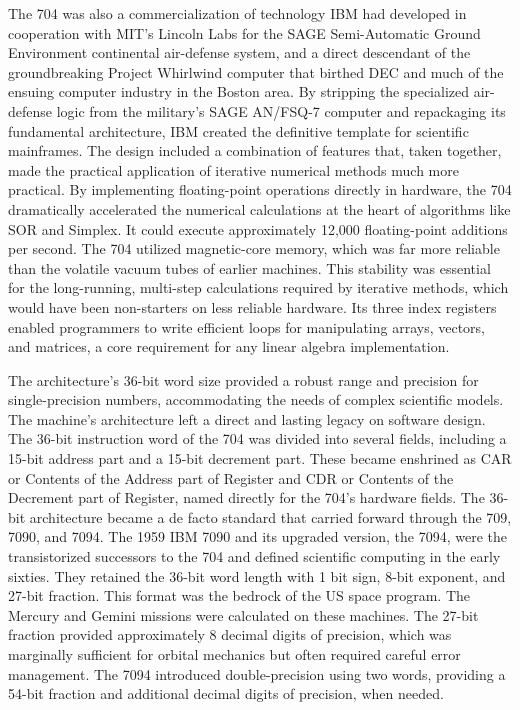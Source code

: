 The 704 was also a commercialization of technology IBM had developed in cooperation with MIT's Lincoln Labs for the SAGE Semi-Automatic Ground Environment continental air-defense system, and a direct descendant of the groundbreaking Project Whirlwind computer that birthed DEC and much of the ensuing computer industry in the Boston area. By stripping the specialized air-defense logic from the military’s SAGE AN/FSQ-7 computer and repackaging its fundamental architecture, IBM created the definitive template for scientific mainframes. The design included a combination of features that, taken together, made the practical application of iterative numerical methods much more practical. By implementing floating-point operations directly in hardware, the 704 dramatically accelerated the numerical calculations at the heart of algorithms like SOR and Simplex. It could execute approximately 12,000 floating-point additions per second. The 704 utilized magnetic-core memory, which was far more reliable than the volatile vacuum tubes of earlier machines. This stability was essential for the long-running, multi-step calculations required by iterative methods, which would have been non-starters on less reliable hardware. Its three index registers enabled programmers to write efficient loops for manipulating arrays, vectors, and matrices, a core requirement for any linear algebra implementation. 

The architecture’s 36-bit word size provided a robust range and precision for single-precision numbers, accommodating the needs of complex scientific models. The machine's architecture left a direct and lasting legacy on software design. The 36-bit instruction word of the 704 was divided into several fields, including a 15-bit address part and a 15-bit decrement part. These became enshrined as CAR or Contents of the Address part of Register and CDR or Contents of the Decrement part of Register, named directly for the 704’s hardware fields. The 36-bit architecture became a de facto standard that carried forward through the 709, 7090, and 7094. The 1959 IBM 7090 and its upgraded version, the 7094, were the transistorized successors to the 704 and defined scientific computing in the early sixties. They retained the 36-bit word length with 1 bit sign, 8-bit exponent, and 27-bit fraction. This format was the bedrock of the US space program. The Mercury and Gemini missions were calculated on these machines. The 27-bit fraction provided approximately 8 decimal digits of precision, which was marginally sufficient for orbital mechanics but often required careful error management. The 7094 introduced double-precision using two words, providing a 54-bit fraction and additional decimal digits of precision, when needed. 

